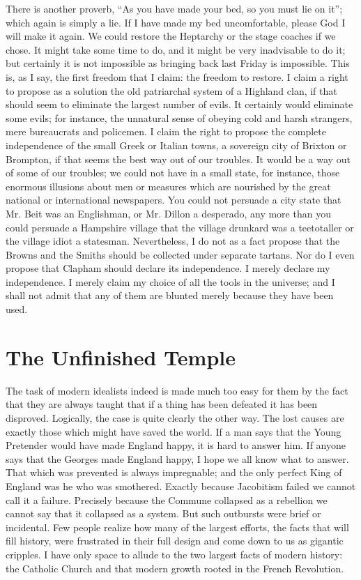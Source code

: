 \documentclass{book}
\begin{document}
There is another proverb, “As you have made your bed, so you must lie on it”; which again is simply a lie. If I have made my bed uncomfortable, please God I will make it again. We could restore the Heptarchy or the stage coaches if we chose. It might take some time to do, and it might be very inadvisable to do it; but certainly it is not impossible as bringing back last Friday is impossible. This is, as I say, the first freedom that I claim: the freedom to restore. I claim a right to propose as a solution the old patriarchal system of a Highland clan, if that should seem to eliminate the largest number of evils. It certainly would eliminate some evils; for instance, the unnatural sense of obeying cold and harsh strangers, mere bureaucrats and policemen. I claim the right to propose the complete independence of the small Greek or Italian towns, a sovereign city of Brixton or Brompton, if that seems the best way out of our troubles. It would be a way out of some of our troubles; we could not have in a small state, for instance, those enormous illusions about men or measures which are nourished by the great national or international newspapers. You could not persuade a city state that Mr. Beit was an Englishman, or Mr. Dillon a desperado, any more than you could persuade a Hampshire village that the village drunkard was a teetotaller or the village idiot a statesman. Nevertheless, I do not as a fact propose that the Browns and the Smiths should be collected under separate tartans. Nor do I even propose that Clapham should declare its independence. I merely declare my independence. I merely claim my choice of all the tools in the universe; and I shall not admit that any of them are blunted merely because they have been used.

\chapter{The Unfinished Temple}
\label{chapter-6}
The task of modern idealists indeed is made much too easy for them by the fact that they are always taught that if a thing has been defeated it has been disproved. Logically, the case is quite clearly the other way. The lost causes are exactly those which might have saved the world. If a man says that the Young Pretender would have made England happy, it is hard to answer him. If anyone says that the Georges made England happy, I hope we all know what to answer. That which was prevented is always impregnable; and the only perfect King of England was he who was smothered. Exactly because Jacobitism failed we cannot call it a failure. Precisely because the Commune collapsed as a rebellion we cannot say that it collapsed as a system. But such outbursts were brief or incidental. Few people realize how many of the largest efforts, the facts that will fill history, were frustrated in their full design and come down to us as gigantic cripples. I have only space to allude to the two largest facts of modern history: the Catholic Church and that modern growth rooted in the French Revolution.
\end{document}
